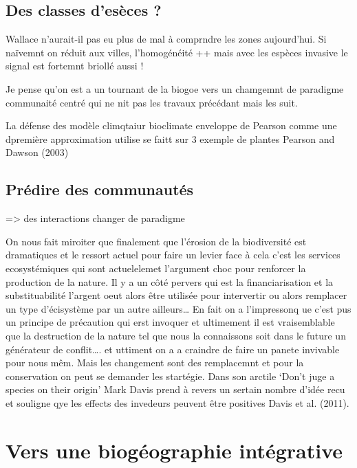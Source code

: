 \subsection{Des classes d'esèces ?}\label{des-classes-desuxe8ces}

Wallace n'aurait-il pas eu plus de mal à comprndre les zones
aujourd'hui. Si naïvemnt on réduit aux villes, l'homogénéité ++ mais
avec les espèces invasive le signal est fortemnt briollé aussi !

Je pense qu'on est a un tournant de la biogoe vers un chamgemnt de
paradigme communaité centré qui ne nit pas les travaux précédant mais
les suit.

La défense des modèle climqtaiur bioclimate enveloppe de Pearson comme
une dpremière approximation utilise se faitt sur 3 exemple de plantes
Pearson and Dawson (2003)

\subsection{Prédire des
communautés}\label{pruxe9dire-des-communautuxe9s}

=\textgreater{} des interactions changer de paradigme

On nous fait miroiter que finalement que l'érosion de la biodiversité
est dramatiques et le ressort actuel pour faire un levier face à cela
c'est les services ecosystémiques qui sont actuelelemet l'argument choc
pour renforcer la production de la nature. Il y a un côté pervers qui
est la financiarisation et la substituabilité l'argent oeut alors être
utilisée pour intervertir ou alors remplacer un type d'écisystème par un
autre ailleurs\ldots{} En fait on a l'impressonq ue c'est pus un
principe de précaution qui erst invoquer et ultimement il est
vraisemblable que la destruction de la nature tel que nous la
connaissons soit dans le future un générateur de conflit\ldots{}. et
uttiment on a a craindre de faire un panete invivable pour nous mêm.
Mais les changement sont des remplacemnt et pour la conservation on peut
se demander les startégie. Dans son arctile `Don't juge a species on
their origin' Mark Davis prend à revers un sertain nombre d'idée recu et
souligne qye les effects des invedeurs peuvent être positives Davis et
al. (2011).

\section*{Vers une biogéographie
intégrative}\label{vers-une-bioguxe9ographie-intuxe9grative}

